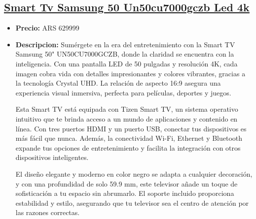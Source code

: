 \documentclass{article}
\begin{document}
\begin{adjustwidth}{2em}{}
    \vspace{1\baselineskip} %
    \end{adjustwidth}

    
    \begin{adjustwidth}{2em}{}

    \subsection{\underline{\href{https://www.mercadolibre.com.ar/smart-tv-samsung-50-un50cu7000gczb-led-4k/p/MLA28001260}{Smart Tv Samsung 50 Un50cu7000gczb Led 4k}}}
    \begin{itemize}
        \item \textbf{Precio:} ARS 629999
        \item \textbf{Descripcion:} Sumérgete en la era del entretenimiento con la Smart TV Samsung 50" UN50CU7000GCZB, donde la claridad se encuentra con la inteligencia. Con una pantalla LED de 50 pulgadas y resolución 4K, cada imagen cobra vida con detalles impresionantes y colores vibrantes, gracias a la tecnología Crystal UHD. La relación de aspecto 16:9 asegura una experiencia visual inmersiva, perfecta para películas, deportes y juegos.

Esta Smart TV está equipada con Tizen Smart TV, un sistema operativo intuitivo que te brinda acceso a un mundo de aplicaciones y contenido en línea. Con tres puertos HDMI y un puerto USB, conectar tus dispositivos es más fácil que nunca. Además, la conectividad Wi-Fi, Ethernet y Bluetooth expande tus opciones de entretenimiento y facilita la integración con otros dispositivos inteligentes.

El diseño elegante y moderno en color negro se adapta a cualquier decoración, y con una profundidad de solo 59.9 mm, este televisor añade un toque de sofisticación a tu espacio sin abrumarlo. El soporte incluido proporciona estabilidad y estilo, asegurando que tu televisor sea el centro de atención por las razones correctas.


\end{itemize}
\end{adjustwidth}
\end{document}
